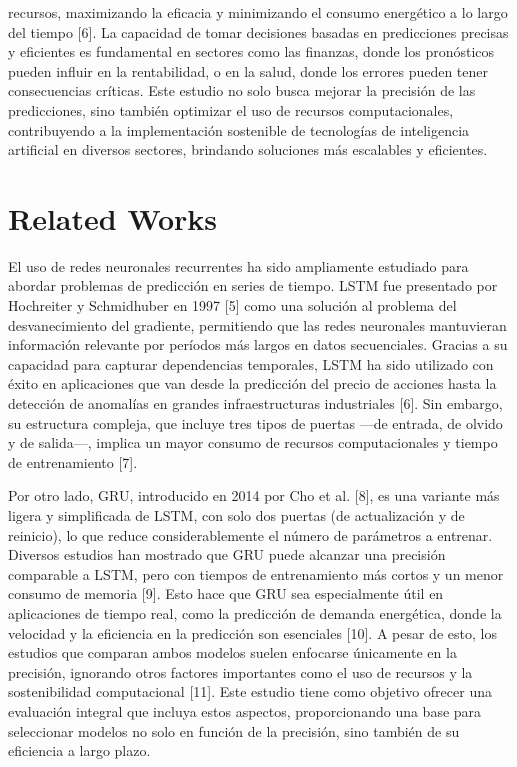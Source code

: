 \documentclass[usenatbib]{tjaa}
\begin{document}
recursos, maximizando la eficacia y minimizando el consumo energético a lo largo del tiempo [6]. La capacidad de tomar decisiones basadas en predicciones precisas y eficientes es fundamental en sectores como las finanzas, donde los pronósticos pueden influir en la rentabilidad, o en la salud, donde los errores pueden tener consecuencias críticas. Este estudio no solo busca mejorar la precisión de las predicciones, sino también optimizar el uso de recursos computacionales, contribuyendo a la implementación sostenible de tecnologías de inteligencia artificial en diversos sectores, brindando soluciones más escalables y eficientes.

\section{Related Works}
El uso de redes neuronales recurrentes ha sido ampliamente estudiado para abordar problemas de predicción en series de tiempo. LSTM fue presentado por Hochreiter y Schmidhuber en 1997 [5] como una solución al problema del desvanecimiento del gradiente, permitiendo que las redes neuronales mantuvieran información relevante por períodos más largos en datos secuenciales. Gracias a su capacidad para capturar dependencias temporales, LSTM ha sido utilizado con éxito en aplicaciones que van desde la predicción del precio de acciones hasta la detección de anomalías en grandes infraestructuras industriales [6]. Sin embargo, su estructura compleja, que incluye tres tipos de puertas —de entrada, de olvido y de salida—, implica un mayor consumo de recursos computacionales y tiempo de entrenamiento [7]. 

Por otro lado, GRU, introducido en 2014 por Cho et al. [8], es una variante más ligera y simplificada de LSTM, con solo dos puertas (de actualización y de reinicio), lo que reduce considerablemente el número de parámetros a entrenar. Diversos estudios han mostrado que GRU puede alcanzar una precisión comparable a LSTM, pero con tiempos de entrenamiento más cortos y un menor consumo de memoria [9]. Esto hace que GRU sea especialmente útil en aplicaciones de tiempo real, como la predicción de demanda energética, donde la velocidad y la eficiencia en la predicción son esenciales [10]. A pesar de esto, los estudios que comparan ambos modelos suelen enfocarse únicamente en la precisión, ignorando otros factores importantes como el uso de recursos y la sostenibilidad computacional [11]. Este estudio tiene como objetivo ofrecer una evaluación integral que incluya estos aspectos, proporcionando una base para seleccionar modelos no solo en función de la precisión, sino también de su eficiencia a largo plazo. 
\end{document}
